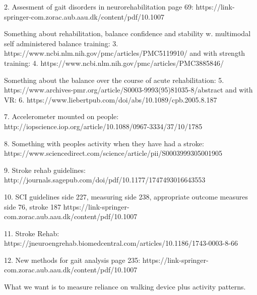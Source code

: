 2. Assesment of gait disorders in neurorehabilitation page 69:
https://link-springer-com.zorac.aub.aau.dk/content/pdf/10.1007%

Something about rehabilitation, balance confidence and stability w. multimodal self administered balance training: 3. https://www.ncbi.nlm.nih.gov/pmc/articles/PMC5119910/ and with strength training: 4. https://www.ncbi.nlm.nih.gov/pmc/articles/PMC3885846/ 

Something about the balance over the course of acute rehabilitation: 5. https://www.archives-pmr.org/article/S0003-9993(95)81035-8/abstract and with VR: 6. https://www.liebertpub.com/doi/abs/10.1089/cpb.2005.8.187

7. Accelerometer mounted on people: http://iopscience.iop.org/article/10.1088/0967-3334/37/10/1785

8. Something with peoples activity when they have had a stroke: https://www.sciencedirect.com/science/article/pii/S0003999305001905

9. Stroke rehab guidelines: http://journals.sagepub.com/doi/pdf/10.1177/1747493016643553

10. SCI guidelines side 227, measuring side 238, appropriate outcome measures side 76, stroke 187 https://link-springer-com.zorac.aub.aau.dk/content/pdf/10.1007%

11. Stroke Rehab:
https://jneuroengrehab.biomedcentral.com/articles/10.1186/1743-0003-8-66

12. New methods for gait analysis page 235:
https://link-springer-com.zorac.aub.aau.dk/content/pdf/10.1007%

What we want is to measure reliance on walking device plus activity patterns.